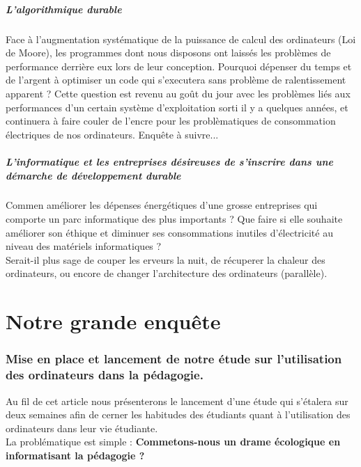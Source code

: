 \documentclass[a4paper,11pt,french]{article}
\begin{document}
\subsubsection{L'algorithmique durable}
Face à l'augmentation systématique de la puissance de calcul des ordinateurs (Loi de Moore), les programmes dont nous disposons ont laissés les problèmes de performance derrière eux lors de leur conception. Pourquoi dépenser du temps et de l'argent à optimiser un code qui s'executera sans problème de ralentissement apparent ? 
Cette question est revenu au goût du jour avec les problèmes liés aux performances d'un certain système d'exploitation sorti il y a quelques années, et continuera à faire couler de l'encre pour les problèmatiques de consommation électriques de nos ordinateurs. Enquête à suivre... \\

\subsubsection{L'informatique et les entreprises désireuses de s'inscrire dans une démarche de développement durable}
Commen améliorer les dépenses énergétiques d'une grosse entreprises qui comporte un parc informatique des plus importants ? 
Que faire si elle souhaite améliorer son éthique et diminuer ses consommations inutiles d'électricité au niveau des matériels informatiques ?\\
Serait-il plus sage de couper les erveurs la nuit, de récuperer la chaleur des ordinateurs, ou encore de changer l'architecture des ordinateurs (parallèle).


\newpage
\part{Notre grande enquête}

\section[Lancement de l'étude]{Mise en place et lancement de notre étude sur l'utilisation des ordinateurs dans la pédagogie.}
Au fil de cet article nous présenterons le lancement d'une étude qui s'étalera sur deux semaines afin de cerner les habitudes des étudiants quant à l'utilisation des ordinateurs dans leur vie étudiante.\\

La problématique est simple : \textbf{Commetons-nous un drame écologique en informatisant la pédagogie ?}\\
\end{document}
